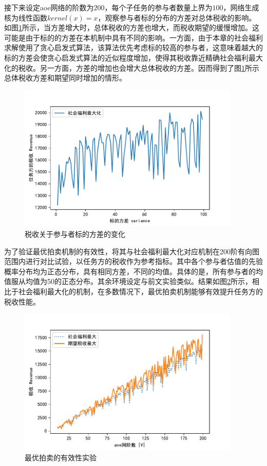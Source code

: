 \documentclass[promaster]{thesis-uestc}
\begin{document}
接下来设定aoe网络的阶数为$200$，每个子任务的参与者数量上界为$100$，网络生成核为线性函数$kernel(x)=x$，观察参与者标的分布的方差对总体税收的影响。如图\ref{revenuevsvar}所示，当方差增大时，总体税收的方差也增大，而税收期望的缓慢增加。这可能是由于标的的方差在本机制中具有不同的影响。一方面，由于本章的社会福利求解使用了贪心启发式算法，该算法优先考虑标的较高的参与者，这意味着越大的标的方差会使贪心启发式算法的近似程度增加，使得其税收靠近精确社会福利最大化的税收。另一方面，方差的增加也会增大总体税收的方差。因而得到了图\ref{revenuevsvar}所示总体税收方差和期望同时增加的情形。

\begin{figure}[H]
    \includegraphics[width=300pt]{exp/revenuevsvar.pdf}
    \caption{税收关于参与者标的方差的变化}
    \label{revenuevsvar}
\end{figure}

为了验证最优拍卖机制的有效性，将其与社会福利最大化对应机制在200阶有向图范围内进行对比试验，以任务方的税收作为参考指标。其中各个参与者估值的先验概率分布均为正态分布，具有相同方差，不同的均值。具体的是，所有参与者的均值服从均值为50的正态分布。其余环境设定与前文实验类似。结果如图\ref{picc}所示，相比于社会福利最大化的机制，在多数情况下，最优拍卖机制能够有效提升任务方的税收性能。

\begin{figure}[H]
    \includegraphics[width=300pt]{exp/SWandoptimal.pdf}
    \caption{最优拍卖的有效性实验}
    \label{picc}
\end{figure}
\end{document}

